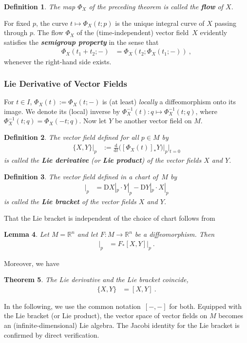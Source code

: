 \documentclass[10pt,a4paper]{article}
\theoremstyle{mytheorem}
\newtheorem{theorem}{Theorem}[section]
\newtheorem{lemma}[theorem]{Lemma}
\theoremstyle{mydefinition}
\newtheorem{definition}[theorem]{Definition}
\newcommand{\mydef}[1]{\textbf{\textit{#1}}}
\newcommand{\dt}{\mathrm{d}}
\newcommand{\Dt}{\mathrm{D}}
\begin{document}
\begin{definition}
The map $\Phi_X$ of the preceding theorem is called the \mydef{flow} of $X$.
\end{definition}

For fixed $p$, the curve $t\mapsto\Phi_X(t; p)$ is the unique integral curve of $X$ passing through $p$.
The flow $\Phi_X$ of the (time-independent) vector field~$X$ evidently satisfies the \mydef{semigroup property} in the sense that
\begin{align*}
	\Phi_X(t_1 + t_2; -)
	&= \Phi_X(t_2; \Phi_X(t_1; -))
	\ ,
\end{align*}
whenever the right-hand side exists.

\subsubsection{Lie Derivative of Vector Fields}

For $t\in I$, $\Phi_X(t):=\Phi_X(t;-)$ is (at least) \emph{locally} a diffeomorphism onto its image.
We denote its (local) inverse by $\Phi_X^{-1}(t):q\mapsto\Phi_X^{-1}(t;q)$, where $\Phi_X^{-1}(t;q)=\Phi_X(-t;q)$.
Now let $Y$ be another vector field on $M$.

\begin{definition}
The vector field defined for all $p\in M$ by
\begin{align*}
	\{X, Y\}\big|_{p} &:= 
	\frac{\dt}{\dt t}
	\big(
		[\Phi_X(t)]_* Y
	\big)
	\big|_{p}
	\Big|_{t=0}
\end{align*}
is called the \mydef{Lie derivative} (or \mydef{Lie product}) of the vector fields $X$ and $Y$.
\end{definition}

\begin{definition}
The vector field defined in a chart of~$M$ by
\begin{align*}
	[X, Y]\big|_{p}
	&=
	\Dt X|_{p}
	\cdot
	Y|_{p}
	-
	\Dt Y|_{p}
	\cdot
	X|_{p}
\end{align*}
is called the \mydef{Lie bracket} of the vector fields $X$ and $Y$.
\end{definition}
That the Lie bracket is independent of the choice of chart follows from
\begin{lemma}
\label{th:pushForwardLie}
Let $M=\mathbb{R}^n$ and let $F:M\rightarrow\mathbb{R}^n$
be a diffeomorphism.
Then
\begin{align*}
	[F_*X, F_*Y]\big|_{p}
	&= F_*[X, Y]|_p
	\ .
\end{align*}
\end{lemma}
Moreover, we have
\begin{theorem}
\label{th:LieBracket}
The Lie derivative and the Lie bracket coincide,
\begin{align*}
	\{X, Y\} &= [X, Y]
	\ .
\end{align*}
\end{theorem}
In the following, we use the common notation~$[-,-]$ for both.
Equipped with the Lie bracket (or Lie product), the vector space of vector fields on $M$ becomes an (infinite-dimensional) Lie algebra.
The Jacobi identity for the Lie bracket is confirmed by direct verification.
\end{document}
